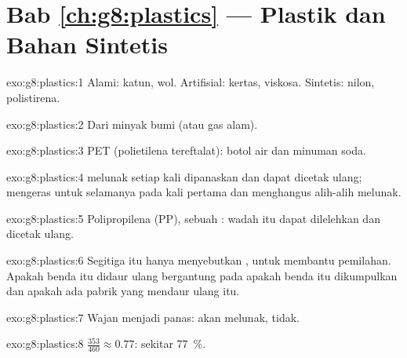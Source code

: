 \section*{Bab \ref{ch:g8:plastics} --- Plastik dan Bahan Sintetis}

\begin{solution}{exo:g8:plastics:1}
Alami: katun, wol. Artifisial: kertas, viskosa. Sintetis: nilon,
polistirena.
\end{solution}

\begin{solution}{exo:g8:plastics:2}
Dari minyak bumi (atau gas alam).
\end{solution}

\begin{solution}{exo:g8:plastics:3}
PET (polietilena tereftalat): botol air dan minuman soda.
\end{solution}

\begin{solution}{exo:g8:plastics:4}
 melunak setiap kali dipanaskan dan dapat dicetak ulang;
 mengeras untuk selamanya pada kali pertama dan menghangus
alih-alih melunak.
\end{solution}

\begin{solution}{exo:g8:plastics:5}
Polipropilena (PP), sebuah : wadah itu dapat dilelehkan dan
dicetak ulang.
\end{solution}

\begin{solution}{exo:g8:plastics:6}
Segitiga itu hanya menyebutkan , untuk membantu pemilahan.
Apakah benda itu didaur ulang bergantung pada apakah benda itu
dikumpulkan dan apakah ada pabrik yang mendaur ulang  itu.
\end{solution}

\begin{solution}{exo:g8:plastics:7}
Wajan menjadi panas:  akan melunak,  tidak.
\end{solution}

\begin{solution}{exo:g8:plastics:8}
$\frac{353}{460} \approx 0.77$: sekitar \qty{77}{\percent}.
\end{solution}

